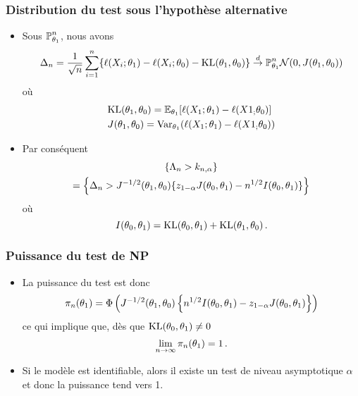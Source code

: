 \begin{frame}
\frametitle{Distribution du test sous l'hypothèse alternative}
\begin{itemize}
\item Sous $\operatorname{{\mathbb P}}^n_{\theta_1}$, nous avons
\[
\Delta_n= \frac{1}{\sqrt{n}} \sum_{i=1}^n \{ \ell(X_i;\theta_1) - \ell(X_i;\theta_0) - \mathrm{KL}(\theta_1,\theta_0) \}
\stackrel{d}{\rightarrow}{\operatorname{{\mathbb P}}^n_{\theta_1}} \mathcal{N}( 0, J(\theta_1,\theta_0) )
\]
où
\begin{align*}
&\mathrm{KL}(\theta_1,\theta_0)= \operatorname{{\mathbb E}}_{\theta_1}[ \ell(X_1;\theta_1) - \ell(X1_;\theta_0)]  \\
&J(\theta_1,\theta_0) = \operatorname{\mathrm{Var}}_{\theta_1} ( \ell(X_1;\theta_1) - \ell(X1_;\theta_0) )
\end{align*}
\pause \item Par conséquent
\begin{multline*}
\{ \Lambda_n > k_{n,\alpha} \} \\
= \left\{ \Delta_n > J^{-1/2}(\theta_1,\theta_0) \{z_{1-\alpha}J(\theta_0,\theta_1) - n^{1/2} I(\theta_0,\theta_1) \} \right\}
\end{multline*}
où
$$
I(\theta_0,\theta_1)= \mathrm{KL}(\theta_0,\theta_1) + \mathrm{KL}(\theta_1,\theta_0) \,.
$$
\end{itemize}
\end{frame}

\begin{frame}
\frametitle{Puissance du test de NP}
\begin{itemize}
\item La puissance du test est donc
\[
\pi_n(\theta_1)= \Phi\left( J^{-1/2}(\theta_1,\theta_0) \left\{ n^{1/2} I(\theta_0,\theta_1) - z_{1-\alpha}J(\theta_0,\theta_1) \right\} \right)
\]
ce qui implique que, dès que $\mathrm{KL}(\theta_0,\theta_1) \ne 0$
\[
\lim_{n \to \infty} \pi_n(\theta_1)= 1 \,.
\]
\item Si le modèle est identifiable, alors il existe un test de niveau asymptotique $\alpha$ et donc la puissance tend vers 1.
\end{itemize}
\end{frame}

